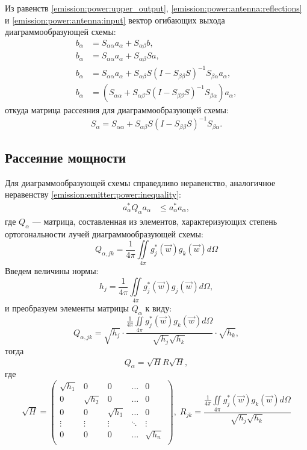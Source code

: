 Из равенств \eqref{emission:power:upper_output}, \eqref{emission:power:antenna:reflections} и \eqref{emission:power:antenna:input} вектор огибающих выхода
диаграммообразующей схемы:
\begin{align*}
    b_\alpha & = S_{\alpha \alpha} a_\alpha + S_{\alpha \beta} b , \\
    b_\alpha & = S_{\alpha \alpha} a_\alpha + S_{\alpha \beta} S a , \\
    b_\alpha & = S_{\alpha \alpha} a_\alpha + S_{\alpha \beta} S ( I - S_{\beta \beta} S )^{-1} S_{\beta \alpha} a_\alpha , \\
    b_\alpha & = ( S_{\alpha \alpha} + S_{\alpha \beta} S ( I - S_{\beta \beta} S )^{-1} S_{\beta \alpha} ) a_\alpha ,
\end{align*}
откуда матрица рассеяния для диаграммообразующей схемы:
\begin{equation}
    \label{emission:power:scheme:reflections}
    S_\alpha = S_{\alpha \alpha} + S_{\alpha \beta} S ( I - S_{\beta \beta} S )^{-1} S_{\beta \alpha} .
\end{equation}

\subsection{Рассеяние мощности}

Для диаграммообразующей схемы справедливо неравенство, аналогичное неравенству \eqref{emission:emitter:power:inequality}:
\begin{align}
    a_\alpha^* Q_\alpha a_\alpha & \le a_\alpha^* a_\alpha , \label{emission:power:scheme:inequality}
\end{align}
где $Q_\alpha$ --- матрица, составленная из элементов, характеризующих степень ортогональности лучей диаграммообразующей схемы:
\[
    Q_{\alpha,jk} = \frac{1}{4 \pi} \iint \limits_{4 \pi} g_{j}^*(\vec{w}) g_{k}(\vec{w}) d \Omega
\]
Введем величины нормы:
\[
    h_j = \frac{1}{4 \pi} \iint \limits_{4 \pi} g_{j}^*(\vec{w}) g_{j}(\vec{w}) d \Omega ,
\]
и преобразуем элементы матрицы $Q_\alpha$ к виду:
\[
    Q_{\alpha,jk}
    =
    \sqrt{h_j}
    \cdot
    \frac{\frac{1}{4 \pi} \iint \limits_{4 \pi} g_j^*(\vec{w}) g_k(\vec{w}) d \Omega}{\sqrt{h_j} \sqrt{h_k}}
    \cdot
    \sqrt{h_k} ,
\]
тогда
\[
    Q_\alpha = \sqrt{H} R \sqrt{H} ,
\]
где
\[
    \sqrt{H}
    = \begin{pmatrix}
          \sqrt{h_1} & 0          & 0          & \dots  & 0          \\
          0          & \sqrt{h_2} & 0          & \dots  & 0          \\
          0          & 0          & \sqrt{h_3} & \dots  & 0          \\
          \vdots     & \vdots     & \vdots     & \ddots & \vdots     \\
          0          & 0          & 0          & \dots  & \sqrt{h_n} \\
    \end{pmatrix} ,
    \;
    R_{jk} = \frac{\frac{1}{4 \pi} \iint \limits_{4 \pi} g_j^*(\vec{w}) g_k(\vec{w}) d \Omega}{\sqrt{h_j} \sqrt{h_k}}
\]

